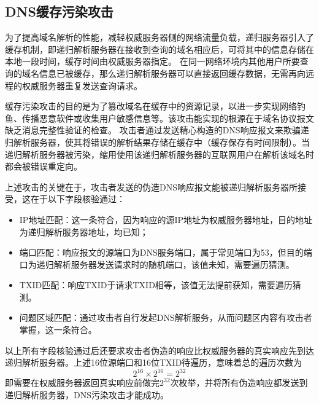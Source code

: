 \subsection{DNS缓存污染攻击}

为了提高域名解析的性能，减轻权威服务器侧的网络流量负载，递归服务器引入了缓存机制，即递归解析服务器在接收到查询的域名相应后，可将其中的信息存储在本地一段时间，缓存时间由权威服务器指定。
在同一网络环境内其他用户所要查询的域名信息已被缓存，那么递归解析服务器可以直接返回缓存数据，无需再向远程的权威服务器重复发送查询请求。

缓存污染攻击的目的是为了篡改域名在缓存中的资源记录，以进一步实现网络钓鱼、传播恶意软件或收集用户敏感信息等。该攻击能实现的根源在于域名协议报文缺乏消息完整性验证的检查。
攻击者通过发送精心构造的DNS响应报文来欺骗递归解析服务器，使其将错误的解析结果存储在缓存中（缓存保存有时间限制）。当递归解析服务器被污染，缩用使用该递归解析服务器的互联网用户在解析该域名时都会被错误重定向。

上述攻击的关键在于，攻击者发送的伪造DNS响应报文能被递归解析服务器所接受，这在于以下字段核验通过：
\begin{itemize}
    \item IP地址匹配：这一条符合，因为响应的源IP地址为权威服务器地址，目的地址为递归解析服务器地址，均已知；
    \item 端口匹配：响应报文的源端口为DNS服务端口，属于常见端口为53，但目的端口为递归解析服务器发送请求时的随机端口，该值未知，需要遍历猜测。
    \item TXID匹配：响应TXID于请求TXID相等，该值无法提前获知，需要遍历猜测。
    \item 问题区域匹配：通过攻击者自行发起DNS解析服务，从而问题区内容有攻击者掌握，这一条符合。
\end{itemize}
以上所有字段核验通过后还要求攻击者伪造的响应比权威服务器的真实响应先到达递归解析服务器。上述16位源端口和16位TXID待遍历，意味着总的遍历次数为
$$
2^{16} \times 2^{16} = 2^{32}
$$
即需要在权威服务器返回真实响应前做完$2^{32}$次枚举，并将所有伪造响应都发送到递归解析服务器，DNS污染攻击才能成功。
